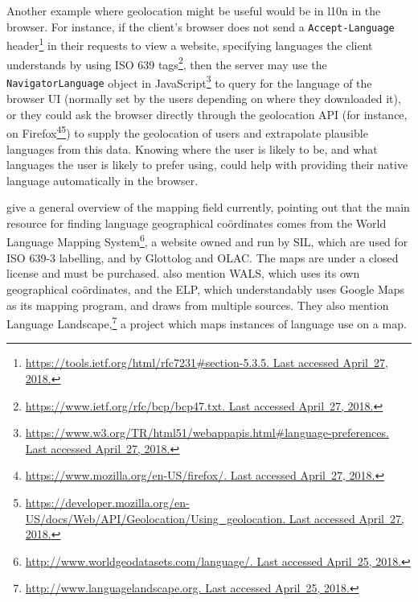 Another example where geolocation might be useful would be in l10n in the browser. For instance, if the client's browser does not send a {\tt Accept-Language} header\footnote{\href{https://tools.ietf.org/html/rfc7231\#section-5.3.5}{https://tools.ietf.org/html/rfc7231\#section-5.3.5. Last accessed April~27, 2018.}} in their requests to view a website, specifying languages the client understands by using ISO 639 tags\footnote{\href{https://www.ietf.org/rfc/bcp/bcp47.txt}{https://www.ietf.org/rfc/bcp/bcp47.txt. Last accessed April~27, 2018.}}, then the server may use the {\tt NavigatorLanguage} object in JavaScript\footnote{\href{https://www.w3.org/TR/html51/webappapis.html\#language-preferences}{https://www.w3.org/TR/html51/webappapis.html\#language-preferences. Last accessed April~27, 2018.}} to query for the language of the browser UI (normally set by the users depending on where they downloaded it), or they could ask the browser directly through the geolocation API (for instance, on Firefox\footnote{\href{https://www.mozilla.org/en-US/firefox/}{https://www.mozilla.org/en-US/firefox/. Last accessed April~27, 2018.}}\footnote{\href{https://developer.mozilla.org/en-US/docs/Web/API/Geolocation/Using\_geolocation}{https://developer.mozilla.org/en-US/docs/Web/API/Geolocation/Using\_geolocation. Last accessed April~27, 2018.}}) to supply the geolocation of users and extrapolate plausible languages from this data. Knowing where the user is likely to be, and what languages the user is likely to prefer using, could help with providing their native language automatically in the browser.

\citet{gawne2016mapmaking} give a general overview of the mapping field currently, pointing out that the main resource for finding language geographical co\"ordinates comes from the World Language Mapping System\footnote{\href{http://www.worldgeodatasets.com/language/.}{http://www.worldgeodatasets.com/language/. Last accessed April~25, 2018.}}, a website owned and run by SIL, which are used for ISO 639-3 labelling, and by Glottolog and OLAC. The maps are under a closed license and must be purchased. \citet{gawne2016mapmaking} also mention WALS, which uses its own geographical co\"ordinates, and the ELP, which understandably uses Google Maps as its mapping program, and draws from multiple sources. They also mention Language Landscape,\footnote{\href{http://www.languagelandscape.org/}{http://www.languagelandscape.org. Last accessed April~25, 2018.}} a project which maps instances of language use on a map.

